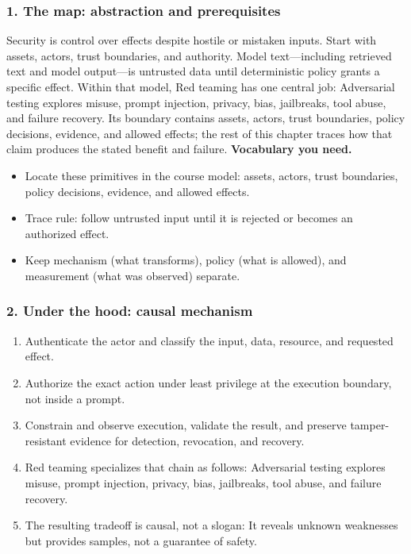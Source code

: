 \subsubsection*{1. The map: abstraction and prerequisites}
Security is control over effects despite hostile or mistaken inputs. Start with assets, actors, trust boundaries, and authority. Model text—including retrieved text and model output—is untrusted data until deterministic policy grants a specific effect.
Within that model, Red teaming has one central job: Adversarial testing explores misuse, prompt injection, privacy, bias, jailbreaks, tool abuse, and failure recovery. Its boundary contains assets, actors, trust boundaries, policy decisions, evidence, and allowed effects; the rest of this chapter traces how that claim produces the stated benefit and failure.
\textbf{Vocabulary you need.}\begin{itemize}
\item Locate these primitives in the course model: assets, actors, trust boundaries, policy decisions, evidence, and allowed effects.
\item Trace rule: follow untrusted input until it is rejected or becomes an authorized effect.
\item Keep mechanism (what transforms), policy (what is allowed), and measurement (what was observed) separate.
\end{itemize}
\subsubsection*{2. Under the hood: causal mechanism}\begin{enumerate}
\item Authenticate the actor and classify the input, data, resource, and requested effect.
\item Authorize the exact action under least privilege at the execution boundary, not inside a prompt.
\item Constrain and observe execution, validate the result, and preserve tamper-resistant evidence for detection, revocation, and recovery.
\item Red teaming specializes that chain as follows: Adversarial testing explores misuse, prompt injection, privacy, bias, jailbreaks, tool abuse, and failure recovery.
\item The resulting tradeoff is causal, not a slogan: It reveals unknown weaknesses but provides samples, not a guarantee of safety.
\end{enumerate}
